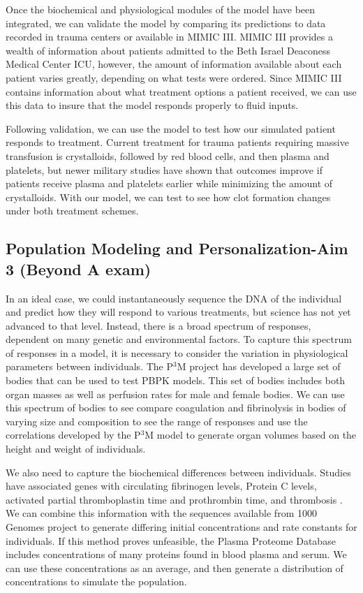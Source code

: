 \documentclass[12pt]{article}
\begin{document}
Once the biochemical and physiological modules of the model have been integrated, we can validate the model by comparing its predictions to data recorded in trauma centers or available in MIMIC III.\cite{johansson2011disseminated,johnson2016mimic} MIMIC III provides a wealth of information about patients admitted to the Beth Israel Deaconess Medical Center ICU, however, the amount of information available about each patient varies greatly, depending on what tests were ordered. Since MIMIC III contains information about what treatment options a patient received, we can use this data to insure that the model responds properly to fluid inputs. 

Following validation, we can use the model to test how our simulated patient responds to treatment. Current treatment for trauma patients requiring massive transfusion is crystalloids, followed by red blood cells, and then plasma and platelets, but newer military studies have shown that outcomes improve if patients receive plasma and platelets earlier while minimizing the amount of crystalloids. \cite{holcomb2008increased} With our model, we can test to see how clot formation changes under both treatment schemes.
\subsection*{Population Modeling and Personalization-Aim 3 (Beyond A exam)}
In an ideal case, we could instantaneously sequence the DNA of the individual and predict how they will respond to various treatments, but science has not yet advanced to that level. Instead, there is a broad spectrum of responses, dependent on many genetic and environmental factors. To capture this spectrum of responses in a model, it is necessary to consider the variation in physiological parameters between individuals. 
The P$^3$M project has developed a large set of bodies that can be used to test PBPK models. \cite{price2003modeling} This set of bodies includes both organ masses as well as perfusion rates for male and female bodies. We can use this spectrum of bodies to see compare coagulation and fibrinolysis in bodies of varying size and composition to see the range of responses and use the correlations developed by the P$^3$M model to generate organ volumes based on the height and weight of individuals. 

We also need to capture the biochemical differences between individuals. Studies have associated genes with circulating fibrinogen levels\cite{dehghan2009association}, Protein C levels\cite{russell2003genetics}, activated partial thromboplastin time and prothrombin time\cite{tang2012genetic}, and thrombosis \cite{lane1996inherited}. We can combine this information with the sequences available from 1000 Genomes project to generate differing initial concentrations and rate constants for individuals. If this method proves unfeasible, the Plasma Proteome Database includes concentrations of many proteins found in blood plasma and serum. \cite{nanjappa2013plasma} We can use these concentrations as an average, and then generate a distribution of concentrations to simulate the population.
\end{document}

